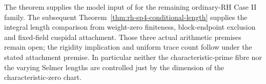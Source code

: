 The theorem supplies the model input of
for the remaining ordinary-RH Case II family. The subsequent
Theorem~\ref{thm:rh-sp4-conditional-length} supplies the integral
length comparison from weight-zero finiteness, block-endpoint
exclusion and fixed-field cuspidal attachment. Those three actual
arithmetic premises remain open; the rigidity implication and
uniform trace count follow under the stated attachment premise. In particular neither the characteristic-prime
fibre nor the varying Selmer lengths are controlled just
by the dimension of the characteristic-zero chart.
